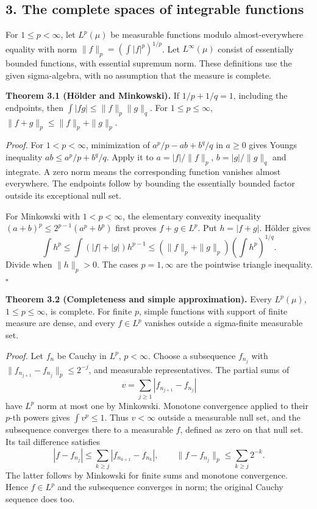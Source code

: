 \documentclass[
  english,
  11pt,
  a4paper,
]{article}
\begin{document}
\subsection{3. The complete spaces of integrable
functions}\label{measure-and-hilbert-space-tools--3-the-complete-spaces-of-integrable-functions}

For \(1\leq p<\infty\), let \(L^p(\mu)\) be measurable functions modulo
almost-everywhere equality with norm \(\|f\|_p=(\int|f|^p)^{1/p}\). Let
\(L^\infty(\mu)\) consist of essentially bounded functions, with
essential supremum norm. These definitions use the given sigma-algebra,
with no assumption that the measure is complete.

\textbf{Theorem 3.1 (Hölder and Minkowski).} If \(1/p+1/q=1\), including
the endpoints, then \(\int|fg|\leq\|f\|_p\|g\|_q\). For
\(1\leq p\leq\infty\), \(\|f+g\|_p\leq\|f\|_p+\|g\|_p\).

\emph{Proof.} For \(1<p<\infty\), minimization of \(a^p/p-ab+b^q/q\) in
\(a\geq0\) gives Young\textquotesingle s inequality
\(ab\leq a^p/p+b^q/q\). Apply it to \(a=|f|/\|f\|_p\), \(b=|g|/\|g\|_q\)
and integrate. A zero norm means the corresponding function vanishes
almost everywhere. The endpoints follow by bounding the essentially
bounded factor outside its exceptional null set.

For Minkowski with \(1<p<\infty\), the elementary convexity inequality
\((a+b)^p\leq2^{p-1}(a^p+b^p)\) first proves \(f+g\in L^p\). Put
\(h=|f+g|\). Hölder gives \[\int h^p\leq\int(|f|+|g|)h^{p-1}
\leq(\|f\|_p+\|g\|_p)\left(\int h^p\right)^{1/q}.\] Divide when
\(\|h\|_p>0\). The cases \(p=1,\infty\) are the pointwise triangle
inequality. \(\square\)

\textbf{Theorem 3.2 (Completeness and simple approximation).} Every
\(L^p(\mu)\), \(1\leq p\leq\infty\), is complete. For finite \(p\),
simple functions with support of finite measure are dense, and every
\(f\in L^p\) vanishes outside a sigma-finite measurable set.

\emph{Proof.} Let \(f_n\) be Cauchy in \(L^p\), \(p<\infty\). Choose a
subsequence \(f_{n_j}\) with \(\|f_{n_{j+1}}-f_{n_j}\|_p\leq2^{-j}\),
and measurable representatives. The partial sums of
\[v=\sum_{j\geq1}|f_{n_{j+1}}-f_{n_j}|\] have \(L^p\) norm at most one
by Minkowski. Monotone convergence applied to their \(p\)-th powers
gives \(\int v^p\leq1\). Thus \(v<\infty\) outside a measurable null
set, and the subsequence converges there to a measurable \(f\), defined
as zero on that null set. Its tail difference satisfies
\[|f-f_{n_j}|\leq\sum_{k\geq j}|f_{n_{k+1}}-f_{n_k}|,
\qquad \|f-f_{n_j}\|_p\leq\sum_{k\geq j}2^{-k}.\] The latter follows by
Minkowski for finite sums and monotone convergence. Hence \(f\in L^p\)
and the subsequence converges in norm; the original Cauchy sequence does
too.
\end{document}
